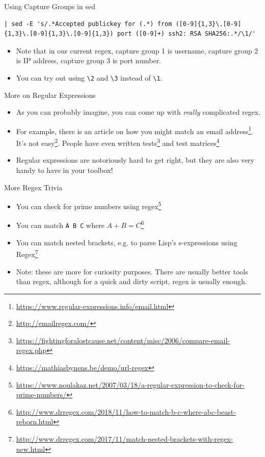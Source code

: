 \documentclass[12pt]{beamer}
\begin{document}
\begin{frame}[fragile]{Using Capture Groups in sed}
  \begin{verbatim}
| sed -E 's/.*Accepted publickey for (.*) from ([0-9]{1,3}\.[0-9]{1,3}\.[0-9]{1,3}\.[0-9]{1,3}) port ([0-9]+) ssh2: RSA SHA256:.*/\1/'
  \end{verbatim}
  \begin{itemize}
    \item Note that in our current regex, capture group 1 is username, capture group 2 is IP address, capture group 3 is port number.
    \item You can try out using \texttt{\textbackslash 2} and \texttt{\textbackslash 3} instead of \texttt{\textbackslash 1}.
  \end{itemize}
\end{frame}

\begin{frame}{More on Regular Expressions}
  \begin{itemize}
    \item As you can probably imagine, you can come up with \emph{really} complicated regex.
    \item For example, there is an article on how you might match an email address\footnote{\url{https://www.regular-expressions.info/email.html}}. It's not easy\footnote{\url{http://emailregex.com/}}. People have even written tests\footnote{\url{https://fightingforalostcause.net/content/misc/2006/compare-email-regex.php}} and test matrices\footnote{\url{https://mathiasbynens.be/demo/url-regex}}
    \item Regular expressions are notoriously hard to get right, but they are also very handy to have in your toolbox!
  \end{itemize}
\end{frame}

\begin{frame}{More Regex Trivia}
  \begin{itemize}
    \item You can check for prime numbers using regex\footnote{\url{https://www.noulakaz.net/2007/03/18/a-regular-expression-to-check-for-prime-numbers/}}
    \item You can match \texttt{A B C} where $A + B = C$\footnote{\url{http://www.drregex.com/2018/11/how-to-match-b-c-where-abc-beast-reborn.html}}
    \item You can match nested brackets, e.g. to parse Lisp's s-expressions using Regex\footnote{\url{http://www.drregex.com/2017/11/match-nested-brackets-with-regex-new.html}}
    \item Note: these are more for curiosity purposes. There are usually better tools than regex, although for a quick and dirty script, regex is usually enough.
  \end{itemize}
\end{frame}
\end{document}
